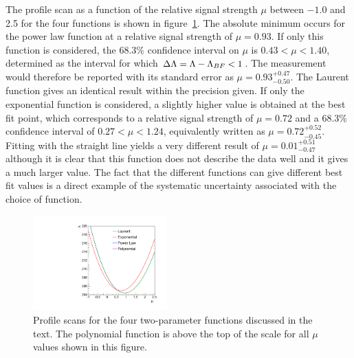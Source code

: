 The profile scan as a function of the relative signal strength $\mu$
between $-1.0$ and 2.5
for the four functions is shown in
figure~\ref{fig:functions:profiles}.
The absolute minimum occurs for the power law function at a relative signal
strength of $\mu = 0.93$. If only this function is considered,
the 68.3\% confidence interval on $\mu$ is
$0.43 < \mu < 1.40 $, determined as the interval for which $\Delta{\rm \ensuremath{\Lambda}} = \Lambda - \Lambda_{BF} < 1$.
The measurement would therefore be reported with its standard error as $\mu=0.93^{+0.47}_{-0.50}$. The Laurent function gives an identical result within the precision given.
If only the exponential function is considered, a slightly higher
\nll value is obtained
at the best fit point, which corresponds to a relative signal strength of $\mu = 0.72$
and a 68.3\% confidence interval of
$0.27 < \mu < 1.24 $, equivalently written as $\mu = 0.72^{+0.52}_{-0.45}$.
Fitting with the straight line yields a very different result of
$\mu = 0.01^{+0.51}_{-0.47}$
although it is clear that this function does not describe the data well and it
gives a much larger \nll value.
The fact that the different functions can give different best fit values
is a direct example of the systematic uncertainty associated
with the choice of function.
%
\begin{figure}[tbp]
\centering
\includegraphics[width=0.46\textwidth]{functions/Profiles.pdf}
\caption{Profile \nll scans for the four two-parameter
functions discussed in the text.
The polynomial function is above the top of the \nll scale for all
$\mu$ values shown in this figure. }
\label{fig:functions:profiles}
\end{figure}


